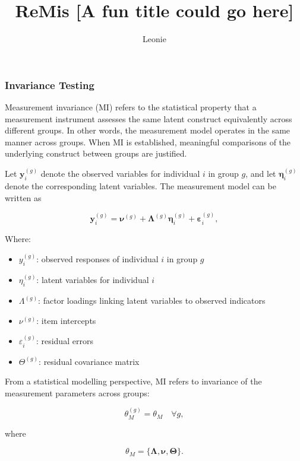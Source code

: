 \documentclass[
  12pt,
  letterpaper,
  man]{apa7}
\title{ReMis {[}A fun title could go here{]}}
\author{Leonie}
\date{}
\providecommand{\tightlist}{%
  \setlength{\itemsep}{0pt}\setlength{\parskip}{0pt}}
\begin{document}
\maketitle


\subsubsection{Invariance Testing}\label{invariance-testing}

Measurement invariance (MI) refers to the statistical property that a
measurement instrument assesses the same latent construct equivalently
across different groups. In other words, the measurement model operates
in the same manner across groups. When MI is established, meaningful
comparisons of the underlying construct between groups are justified.

Let \(\mathbf{y}_i^{(g)}\) denote the observed variables for individual
\(i\) in group \(g\), and let \(\boldsymbol{\eta}_i^{(g)}\) denote the
corresponding latent variables. The measurement model can be written as

\[ 
\mathbf{y}_i^{(g)} = \boldsymbol{\nu}^{(g)} + \boldsymbol{\Lambda}^{(g)} \boldsymbol{\eta}_i^{(g)} + \boldsymbol{\varepsilon}_i^{(g)}, 
\]

Where:

\begin{itemize}
\tightlist
\item
  \(y_i^{(g)}\): observed responses of individual \(i\) in group \(g\)\\
\item
  \(\eta_i^{(g)}\): latent variables for individual \(i\)\\
\item
  \(\Lambda^{(g)}\): factor loadings linking latent variables to
  observed indicators\\
\item
  \(\nu^{(g)}\): item intercepts
\item
  \(\varepsilon_i^{(g)}\): residual errors
\item
  \(\Theta^{(g)}\): residual covariance matrix
\end{itemize}

From a statistical modelling perspective, MI refers to invariance of the
measurement parameters across groups:

\[ \theta_M^{(g)} = \theta_M \quad \forall g ,\]

where

\[ \theta_M = \{\boldsymbol{\Lambda}, \boldsymbol{\nu}, \boldsymbol{\Theta}\}. \]
\end{document}
